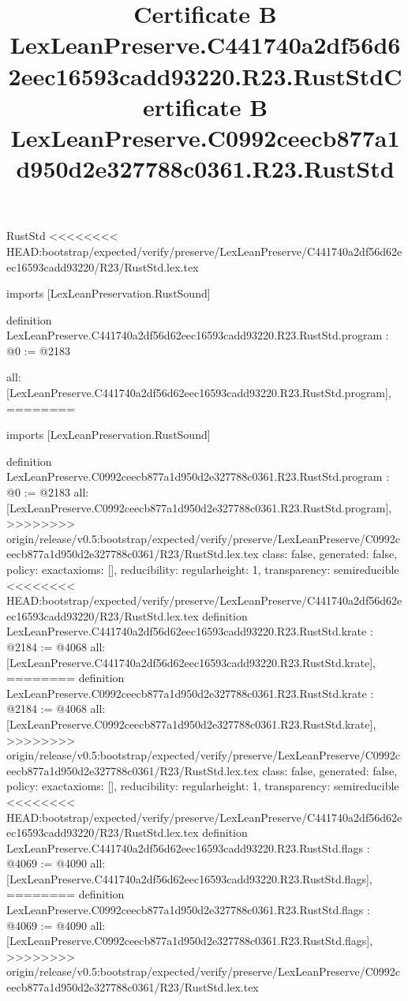 \begin{lexlean}{RustStd}
<<<<<<<< HEAD:bootstrap/expected/verify/preserve/LexLeanPreserve/C441740a2df56d62eec16593cadd93220/R23/RustStd.lex.tex
\title{Certificate B LexLeanPreserve.C441740a2df56d62eec16593cadd93220.R23.RustStd}
\begin{coremodule}
imports [LexLeanPreservation.RustSound]

definition LexLeanPreserve.C441740a2df56d62eec16593cadd93220.R23.RustStd.program : @0 := @2183 {
  all: [LexLeanPreserve.C441740a2df56d62eec16593cadd93220.R23.RustStd.program],
========
\title{Certificate B LexLeanPreserve.C0992ceecb877a1d950d2e327788c0361.R23.RustStd}
\begin{coremodule}
imports [LexLeanPreservation.RustSound]

definition LexLeanPreserve.C0992ceecb877a1d950d2e327788c0361.R23.RustStd.program : @0 := @2183 {
  all: [LexLeanPreserve.C0992ceecb877a1d950d2e327788c0361.R23.RustStd.program],
>>>>>>>> origin/release/v0.5:bootstrap/expected/verify/preserve/LexLeanPreserve/C0992ceecb877a1d950d2e327788c0361/R23/RustStd.lex.tex
  class: false,
  generated: false,
  policy: exact{axioms: []},
  reducibility: regular{height: 1},
  transparency: semireducible
}
<<<<<<<< HEAD:bootstrap/expected/verify/preserve/LexLeanPreserve/C441740a2df56d62eec16593cadd93220/R23/RustStd.lex.tex
definition LexLeanPreserve.C441740a2df56d62eec16593cadd93220.R23.RustStd.krate : @2184 := @4068 {
  all: [LexLeanPreserve.C441740a2df56d62eec16593cadd93220.R23.RustStd.krate],
========
definition LexLeanPreserve.C0992ceecb877a1d950d2e327788c0361.R23.RustStd.krate : @2184 := @4068 {
  all: [LexLeanPreserve.C0992ceecb877a1d950d2e327788c0361.R23.RustStd.krate],
>>>>>>>> origin/release/v0.5:bootstrap/expected/verify/preserve/LexLeanPreserve/C0992ceecb877a1d950d2e327788c0361/R23/RustStd.lex.tex
  class: false,
  generated: false,
  policy: exact{axioms: []},
  reducibility: regular{height: 1},
  transparency: semireducible
}
<<<<<<<< HEAD:bootstrap/expected/verify/preserve/LexLeanPreserve/C441740a2df56d62eec16593cadd93220/R23/RustStd.lex.tex
definition LexLeanPreserve.C441740a2df56d62eec16593cadd93220.R23.RustStd.flags : @4069 := @4090 {
  all: [LexLeanPreserve.C441740a2df56d62eec16593cadd93220.R23.RustStd.flags],
========
definition LexLeanPreserve.C0992ceecb877a1d950d2e327788c0361.R23.RustStd.flags : @4069 := @4090 {
  all: [LexLeanPreserve.C0992ceecb877a1d950d2e327788c0361.R23.RustStd.flags],
>>>>>>>> origin/release/v0.5:bootstrap/expected/verify/preserve/LexLeanPreserve/C0992ceecb877a1d950d2e327788c0361/R23/RustStd.lex.tex
}}}
\end{coremodule}}
\end{coremodule}
\end{lexlean}

